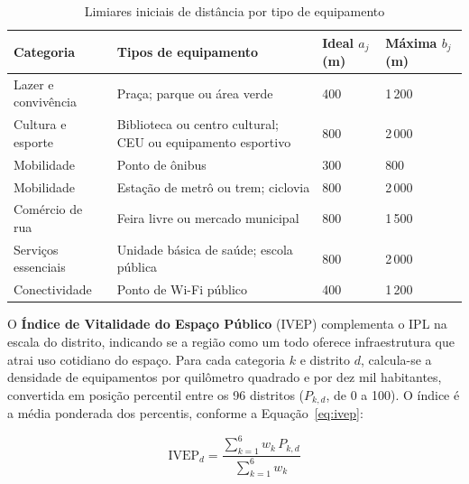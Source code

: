 \begin{table}[htb]
	\caption{Limiares iniciais de distância por tipo de equipamento}
	\label{qua:limiares}
	\centering
	\small
	\begin{tabularx}{\textwidth}{L{3.6cm}XC{2.2cm}C{2.2cm}}
		\toprule
		\textbf{Categoria}  & \textbf{Tipos de equipamento}                               & \textbf{Ideal $a_j$ (m)} & \textbf{Máxima $b_j$ (m)} \\
		\midrule
		Lazer e convivência & Praça; parque ou área verde                                 & 400                      & 1\,200                    \\
		Cultura e esporte   & Biblioteca ou centro cultural; CEU ou equipamento esportivo & 800                      & 2\,000                    \\
		Mobilidade          & Ponto de ônibus                                             & 300                      & 800                       \\
		Mobilidade          & Estação de metrô ou trem; ciclovia                          & 800                      & 2\,000                    \\
		Comércio de rua     & Feira livre ou mercado municipal                            & 800                      & 1\,500                    \\
		Serviços essenciais & Unidade básica de saúde; escola pública                     & 800                      & 2\,000                    \\
		Conectividade       & Ponto de Wi-Fi público                                      & 400                      & 1\,200                    \\
		\bottomrule
	\end{tabularx}
\end{table}

O \textbf{Índice de Vitalidade do Espaço Público} (IVEP) complementa o IPL na escala do distrito, indicando se a região como um todo oferece infraestrutura que atrai uso cotidiano do espaço. Para cada categoria $k$ e distrito $d$, calcula-se a densidade de equipamentos por quilômetro quadrado e por dez mil habitantes, convertida em posição percentil entre os 96 distritos ($P_{k,d}$, de 0 a 100). O índice é a média ponderada dos percentis, conforme a Equação~\ref{eq:ivep}:

\begin{equation}
	\label{eq:ivep}
	\text{IVEP}_d = \frac{\sum_{k=1}^{6} w_k \, P_{k,d}}{\sum_{k=1}^{6} w_k}
\end{equation}

